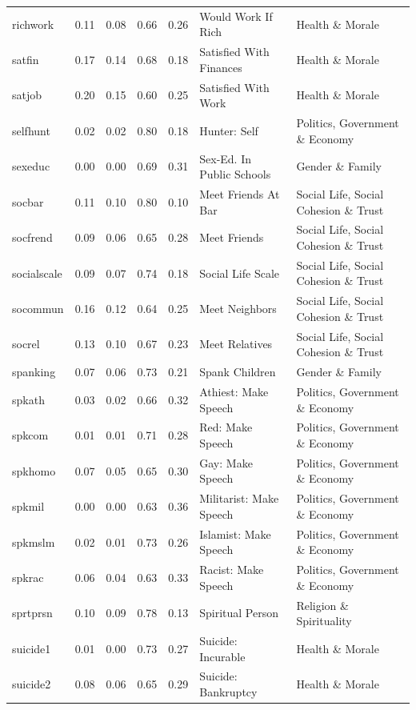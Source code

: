 \documentclass[
  12pt,
]{article}
\begin{document}
\begin{landscape}
\begin{scriptsize}
\begin{longtable}{|p{1.75in}|p{0.3in}|p{0.3in}|p{0.3in}|p{0.3in}|p{2.5in}|p{2.5in}}
richwork & 0.11 & 0.08 & 0.66 & 0.26 & Would Work If Rich & Health \& Morale \\ 
satfin & 0.17 & 0.14 & 0.68 & 0.18 & Satisfied With Finances & Health \& Morale \\ 
satjob & 0.20 & 0.15 & 0.60 & 0.25 & Satisfied With Work & Health \& Morale \\ 
selfhunt & 0.02 & 0.02 & 0.80 & 0.18 & Hunter: Self & Politics, Government \& Economy \\ 
sexeduc & 0.00 & 0.00 & 0.69 & 0.31 & Sex-Ed. In Public Schools & Gender \& Family \\ 
socbar & 0.11 & 0.10 & 0.80 & 0.10 & Meet Friends At Bar & Social Life, Social Cohesion \& Trust \\ 
socfrend & 0.09 & 0.06 & 0.65 & 0.28 & Meet Friends & Social Life, Social Cohesion \& Trust \\ 
socialscale & 0.09 & 0.07 & 0.74 & 0.18 & Social Life Scale & Social Life, Social Cohesion \& Trust \\ 
socommun & 0.16 & 0.12 & 0.64 & 0.25 & Meet Neighbors & Social Life, Social Cohesion \& Trust \\ 
socrel & 0.13 & 0.10 & 0.67 & 0.23 & Meet Relatives & Social Life, Social Cohesion \& Trust \\ 
spanking & 0.07 & 0.06 & 0.73 & 0.21 & Spank Children & Gender \& Family \\ 
spkath & 0.03 & 0.02 & 0.66 & 0.32 & Athiest: Make Speech & Politics, Government \& Economy \\ 
spkcom & 0.01 & 0.01 & 0.71 & 0.28 & Red: Make Speech & Politics, Government \& Economy \\ 
spkhomo & 0.07 & 0.05 & 0.65 & 0.30 & Gay: Make Speech & Politics, Government \& Economy \\ 
spkmil & 0.00 & 0.00 & 0.63 & 0.36 & Militarist: Make Speech & Politics, Government \& Economy \\ 
spkmslm & 0.02 & 0.01 & 0.73 & 0.26 & Islamist: Make Speech & Politics, Government \& Economy \\ 
spkrac & 0.06 & 0.04 & 0.63 & 0.33 & Racist: Make Speech & Politics, Government \& Economy \\ 
sprtprsn & 0.10 & 0.09 & 0.78 & 0.13 & Spiritual Person & Religion \& Spirituality \\ 
suicide1 & 0.01 & 0.00 & 0.73 & 0.27 & Suicide: Incurable & Health \& Morale \\ 
suicide2 & 0.08 & 0.06 & 0.65 & 0.29 & Suicide: Bankruptcy & Health \& Morale \\ 

\end{longtable}
\end{scriptsize}
\end{landscape}
\end{document}
